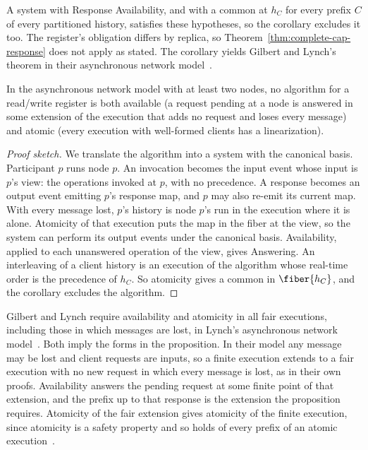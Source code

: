 A system with Response Availability, and with a common \outnoun at $h_C$ for
every prefix $C$ of every partitioned history, satisfies these hypotheses, so
the corollary excludes it too.  The register's obligation differs by replica, so
Theorem~\ref{thm:complete-cap-response} does not apply as stated.  The
corollary yields Gilbert and Lynch's theorem in their asynchronous network
model~\cite{gilbert2002cap}.

\begin{proposition}
\label{prop:gl-async}
In the asynchronous network model with at least two nodes, no algorithm for a
read/write register is both available (a request pending at a node is
answered in some extension of the execution that adds no request and loses
every message) and atomic (every execution with well-formed clients has a
linearization).
\end{proposition}

\begin{proof}[Proof sketch]
We translate the algorithm into a system with the canonical basis.  Participant
$p$ runs node $p$.  An invocation becomes the input event whose input is $p$'s
view: the operations invoked at $p$, with no precedence.  A response becomes an
output event emitting $p$'s response map, and $p$ may also re-emit its current
map.  With every message lost, $p$'s history is node $p$'s run in the
execution where it is alone.  Atomicity of that execution puts the map in the
fiber at the view, so the system can perform its output events under the
canonical basis.  Availability, applied to each unanswered operation of the
view, gives Answering.  An interleaving of a client history is an execution of
the algorithm whose real-time order is the precedence of $h_C$.  So atomicity
gives a common \outnoun in $\fiber{h_C}$, and the corollary excludes the
algorithm.
\end{proof}

Gilbert and Lynch require availability and atomicity in all fair executions,
including those in which messages are lost, in Lynch's asynchronous network
model~\cite[Theorem~1]{gilbert2002cap}\cite[Chapter~8]{lynch1996distributed}.
Both imply the forms in the proposition.  In their model any message may be
lost and client requests are inputs, so a finite execution extends to a fair
execution with no new request in which every message is lost, as in their
own proofs.  Availability answers the pending request at some finite point of
that extension, and the prefix up to that response is the extension the
proposition requires.  Atomicity of the fair extension gives atomicity of the
finite execution, since atomicity is a safety property and so holds of every
prefix of an atomic execution~\cite[Chapter~13]{lynch1996distributed}.
